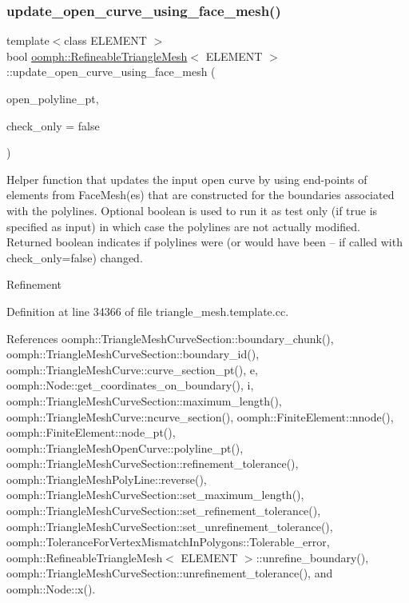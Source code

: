 \subsubsection{\texorpdfstring{update\+\_\+open\+\_\+curve\+\_\+using\+\_\+face\+\_\+mesh()}{update\_open\_curve\_using\_face\_mesh()}}
{\footnotesize\ttfamily template$<$class E\+L\+E\+M\+E\+NT $>$ \\
bool \hyperlink{classoomph_1_1RefineableTriangleMesh}{oomph\+::\+Refineable\+Triangle\+Mesh}$<$ E\+L\+E\+M\+E\+NT $>$\+::update\+\_\+open\+\_\+curve\+\_\+using\+\_\+face\+\_\+mesh (\begin{DoxyParamCaption}\item[{\hyperlink{classoomph_1_1TriangleMeshOpenCurve}{Triangle\+Mesh\+Open\+Curve} $\ast$}]{open\+\_\+polyline\+\_\+pt,  }\item[{const bool \&}]{check\+\_\+only = {\ttfamily false} }\end{DoxyParamCaption})\hspace{0.3cm}{\ttfamily [protected]}}



Helper function that updates the input open curve by using end-\/points of elements from Face\+Mesh(es) that are constructed for the boundaries associated with the polylines. Optional boolean is used to run it as test only (if true is specified as input) in which case the polylines are not actually modified. Returned boolean indicates if polylines were (or would have been -- if called with check\+\_\+only=false) changed. 

Refinement 

Definition at line 34366 of file triangle\+\_\+mesh.\+template.\+cc.



References oomph\+::\+Triangle\+Mesh\+Curve\+Section\+::boundary\+\_\+chunk(), oomph\+::\+Triangle\+Mesh\+Curve\+Section\+::boundary\+\_\+id(), oomph\+::\+Triangle\+Mesh\+Curve\+::curve\+\_\+section\+\_\+pt(), e, oomph\+::\+Node\+::get\+\_\+coordinates\+\_\+on\+\_\+boundary(), i, oomph\+::\+Triangle\+Mesh\+Curve\+Section\+::maximum\+\_\+length(), oomph\+::\+Triangle\+Mesh\+Curve\+::ncurve\+\_\+section(), oomph\+::\+Finite\+Element\+::nnode(), oomph\+::\+Finite\+Element\+::node\+\_\+pt(), oomph\+::\+Triangle\+Mesh\+Open\+Curve\+::polyline\+\_\+pt(), oomph\+::\+Triangle\+Mesh\+Curve\+Section\+::refinement\+\_\+tolerance(), oomph\+::\+Triangle\+Mesh\+Poly\+Line\+::reverse(), oomph\+::\+Triangle\+Mesh\+Curve\+Section\+::set\+\_\+maximum\+\_\+length(), oomph\+::\+Triangle\+Mesh\+Curve\+Section\+::set\+\_\+refinement\+\_\+tolerance(), oomph\+::\+Triangle\+Mesh\+Curve\+Section\+::set\+\_\+unrefinement\+\_\+tolerance(), oomph\+::\+Tolerance\+For\+Vertex\+Mismatch\+In\+Polygons\+::\+Tolerable\+\_\+error, oomph\+::\+Refineable\+Triangle\+Mesh$<$ E\+L\+E\+M\+E\+N\+T $>$\+::unrefine\+\_\+boundary(), oomph\+::\+Triangle\+Mesh\+Curve\+Section\+::unrefinement\+\_\+tolerance(), and oomph\+::\+Node\+::x().




